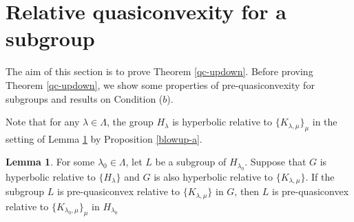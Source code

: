 \documentclass{amsart}
\theoremstyle{definition}
\newtheorem{Lem}[Thm]{Lemma}
\begin{document}
\section{Relative quasiconvexity for a subgroup}

The aim of this section is to prove Theorem \ref{qc-updown}. 
Before proving Theorem \ref{qc-updown}, we show some properties of pre-quasiconvexity for subgroups and results on Condition ($b$). 

Note that for any $\lambda\in\Lambda$, the group $H_\lambda$ is hyperbolic relative to $\{K_{\lambda,\mu}\}_\mu$ in the setting of Lemma \ref{composition} by Proposition \ref{blowup-a}. 

\begin{Lem}\label{composition}
For some $\lambda_0 \in\Lambda$, let $L$ be a subgroup of $H_{\lambda_0}$. 
Suppose that $G$ is hyperbolic relative to $\{H_\lambda\}$ and $G$ is also hyperbolic relative to $\{K_{\lambda,\mu}\}$. 
If the subgroup $L$ is pre-quasiconvex relative to $\{K_{\lambda,\mu}\}$ in $G$, then $L$ is pre-quasiconvex relative to $\{K_{\lambda_0,\mu}\}_\mu$ in $H_{\lambda_0}$
\end{Lem}
\end{document}
